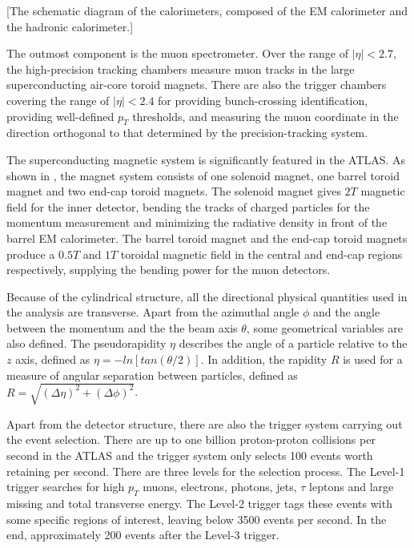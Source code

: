 \documentclass[class=NTHU_thesis, crop=false]{standalone}
\begin{document}
[The schematic diagram of the calorimeters, composed of the EM calorimeter and the hadronic calorimeter.]

The outmost component is the muon spectrometer. Over the range of $\left|\eta\right| < 2.7$, the high-precision tracking chambers measure muon tracks in the large superconducting air-core toroid magnets. There are also the trigger chambers covering the range of $\left|\eta\right| < 2.4$ for providing bunch-crossing identification, providing well-defined $p_T$ thresholds, and measuring the muon coordinate in the direction orthogonal to that determined by the precision-tracking system.

The superconducting magnetic system is significantly featured in the ATLAS. As shown in , the magnet system consists of one solenoid magnet, one barrel toroid magnet and two end-cap toroid magnets. The solenoid magnet gives $2 T$ magnetic field for the inner detector, bending the tracks of charged particles for the momentum measurement and minimizing the radiative density in front of the barrel EM calorimeter. The barrel toroid magnet and the end-cap toroid magnets produce a $0.5 T$ and $1 T$ toroidal magnetic field in the central and end-cap regions respectively, supplying the bending power for the muon detectors.

Because of the cylindrical structure, all the directional physical quantities used in the analysis are transverse. Apart from the azimuthal angle $\phi$ and the angle between the momentum and the the beam axis $\theta$, some geometrical variables are also defined. The pseudorapidity $\eta$ describes the angle of a particle relative to the $z$ axis, defined as $\eta = -ln[tan(\theta/2)]$. In addition, the rapidity $R$ is used for a measure of angular separation between particles, defined as $R = \sqrt{(\Delta\eta)^2 + (\Delta\phi)^2}$.

Apart from the detector structure, there are also the trigger system carrying out the event selection. There are up to one billion proton-proton collisions per second in the ATLAS and the trigger system only selects 100 events worth retaining per second. There are three levels for the selection process. The Level-1 trigger searches for high $p_T$ muons, electrons, photons, jets, $\tau$ leptons and large missing and total transverse energy. The Level-2 trigger tags these events with some specific regions of interest, leaving below 3500 events per second. In the end, approximately 200 events after the Level-3 trigger.
\end{document}
